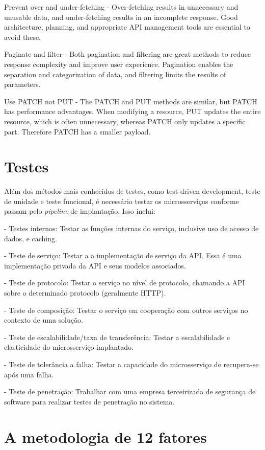Prevent over and under-fetching - Over-fetching results in unnecessary and unusable data, and under-fetching results in an incomplete response. Good architecture, planning, and appropriate API management tools are essential to avoid these.

Paginate and filter - Both pagination and filtering are great methods to reduce response complexity and improve user experience. Pagination enables the separation and categorization of data, and filtering limits the results of parameters.

Use PATCH not PUT - The PATCH and PUT methods are similar, but PATCH has performance advantages. When modifying a resource, PUT updates the entire resource, which is often unnecessary, whereas PATCH only updates a specific part. Therefore PATCH has a smaller payload. \cite{rapidAPI-optimization}

\section{Testes}

Além dos métodos mais conhecidos de testes, como test-driven development, teste de unidade e teste funcional, é necessário testar os microsserviços conforme passam pelo \emph{pipeline} de implantação. Isso inclui:

- Testes internos: Testar as funções internas do serviço, inclusive uso de acesso de dados, e caching.

- Teste de serviço: Testar a a implementação de serviço da API. Essa é uma implementação privada da API e seus modelos associados.

- Teste de protocolo: Testar o serviço no nível de protocolo, chamando a API sobre o determinado protocolo (geralmente HTTP).

- Teste de composição: Testar o serviço em cooperação com outros serviços no contexto de uma solução.

- Teste de escalabilidade/taxa de transferência: Testar a escalabilidade e elasticidade do microsserviço implantado.

- Teste de tolerância a falha: Testar a capacidade do microsserviço de recupera-se após uma falha.

- Teste de penetração: Trabalhar com uma empresa terceirizada de segurança de software para realizar testes de penetração no sistema.

\section{A metodologia de 12 fatores}

